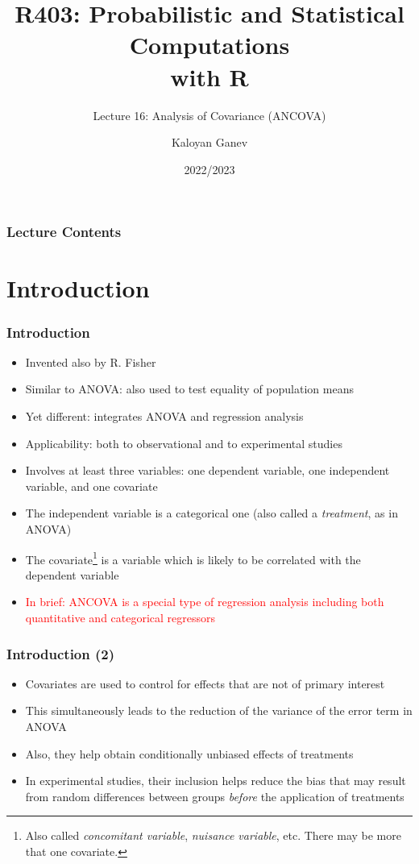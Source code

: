 \documentclass[10pt]{beamer}
\title{R403: Probabilistic and Statistical Computations\\ with R}
\subtitle{Lecture 16: \textcolor{myred}{Analysis of Covariance (ANCOVA)}}
\author{Kaloyan Ganev}
\date{2022/2023}
\theoremstyle{definition}
\begin{document}
\maketitle
\begin{frame}[fragile]
\frametitle{Lecture Contents}
\tableofcontents
\end{frame}

\section{Introduction}
\begin{frame}[fragile]
\frametitle{Introduction}
\begin{itemize}
	\item Invented also by R. Fisher
	\item Similar to ANOVA: also used to test equality of population means
	\item Yet different: integrates ANOVA and regression analysis
	\item Applicability: both to observational and to experimental studies
	\item Involves at least three variables: one dependent variable, one independent variable, and one covariate
	\item The independent variable is a categorical one (also called a \emph{treatment}, as in ANOVA)
	\item The covariate\footnote{Also called \emph{concomitant variable}, \emph{nuisance variable}, etc. There may be more that one covariate.} is a variable which is likely to be correlated with the dependent variable
	\item \textcolor{red}{In brief: ANCOVA is a special type of regression analysis including both quantitative and categorical regressors}
\end{itemize}
\end{frame}

\begin{frame}[fragile]
\frametitle{Introduction (2)}
\begin{itemize}
	\item Covariates are used to control for effects that are not of primary interest
	\item This simultaneously leads to the reduction of the variance of the error term in ANOVA
	\item Also, they help obtain conditionally unbiased effects of treatments
	\item In experimental studies, their inclusion helps reduce the bias that may result from random differences between groups \emph{before} the application of treatments
\end{itemize}
\end{frame}
\end{document}
